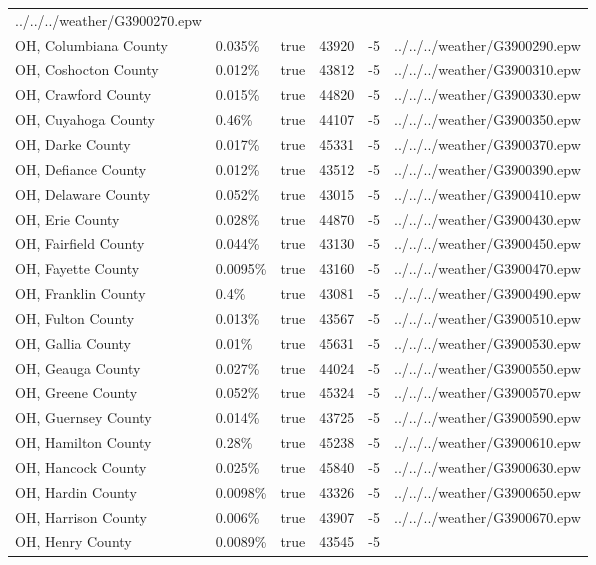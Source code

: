 \begin{longtable}[]{@{}llllll@{}}
../../../weather/G3900270.epw \\
OH, Columbiana County & 0.035\% & true & 43920 & -5 &
../../../weather/G3900290.epw \\
OH, Coshocton County & 0.012\% & true & 43812 & -5 &
../../../weather/G3900310.epw \\
OH, Crawford County & 0.015\% & true & 44820 & -5 &
../../../weather/G3900330.epw \\
OH, Cuyahoga County & 0.46\% & true & 44107 & -5 &
../../../weather/G3900350.epw \\
OH, Darke County & 0.017\% & true & 45331 & -5 &
../../../weather/G3900370.epw \\
OH, Defiance County & 0.012\% & true & 43512 & -5 &
../../../weather/G3900390.epw \\
OH, Delaware County & 0.052\% & true & 43015 & -5 &
../../../weather/G3900410.epw \\
OH, Erie County & 0.028\% & true & 44870 & -5 &
../../../weather/G3900430.epw \\
OH, Fairfield County & 0.044\% & true & 43130 & -5 &
../../../weather/G3900450.epw \\
OH, Fayette County & 0.0095\% & true & 43160 & -5 &
../../../weather/G3900470.epw \\
OH, Franklin County & 0.4\% & true & 43081 & -5 &
../../../weather/G3900490.epw \\
OH, Fulton County & 0.013\% & true & 43567 & -5 &
../../../weather/G3900510.epw \\
OH, Gallia County & 0.01\% & true & 45631 & -5 &
../../../weather/G3900530.epw \\
OH, Geauga County & 0.027\% & true & 44024 & -5 &
../../../weather/G3900550.epw \\
OH, Greene County & 0.052\% & true & 45324 & -5 &
../../../weather/G3900570.epw \\
OH, Guernsey County & 0.014\% & true & 43725 & -5 &
../../../weather/G3900590.epw \\
OH, Hamilton County & 0.28\% & true & 45238 & -5 &
../../../weather/G3900610.epw \\
OH, Hancock County & 0.025\% & true & 45840 & -5 &
../../../weather/G3900630.epw \\
OH, Hardin County & 0.0098\% & true & 43326 & -5 &
../../../weather/G3900650.epw \\
OH, Harrison County & 0.006\% & true & 43907 & -5 &
../../../weather/G3900670.epw \\
OH, Henry County & 0.0089\% & true & 43545 & -5 &

\end{longtable}

